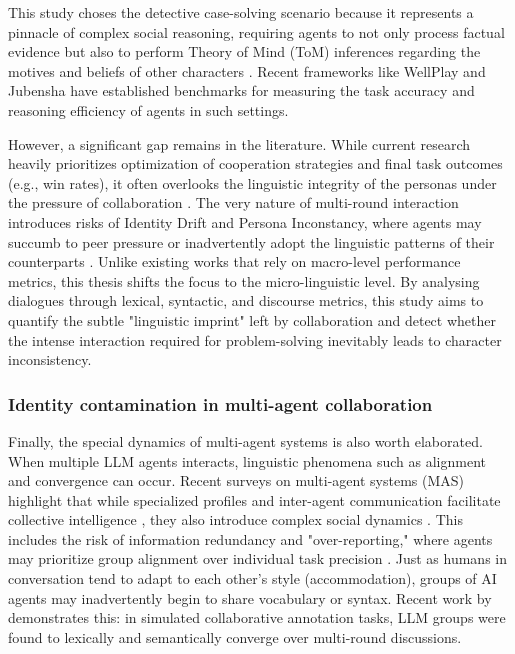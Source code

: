 \documentclass{article}
\begin{document}
This study choses the detective case-solving scenario because it represents a pinnacle of complex social reasoning, requiring agents to not only process factual evidence but also to perform Theory of Mind (ToM) inferences regarding the motives and beliefs of other characters \citep{zhu2024player}. Recent frameworks like WellPlay \citep{zhu2024player} and Jubensha \citep{wu2024jubensha} have established benchmarks for measuring the task accuracy and reasoning efficiency of agents in such settings.

However, a significant gap remains in the literature. While current research heavily prioritizes optimization of cooperation strategies and final task outcomes (e.g., win rates), it often overlooks the linguistic integrity of the personas under the pressure of collaboration \citep{chen2024review, wu2024jubensha, zhu2024player}. The very nature of multi-round interaction introduces risks of Identity Drift and Persona Inconstancy, where agents may succumb to peer pressure or inadvertently adopt the linguistic patterns of their counterparts \citep{choi2024examining, baltaji2024cultured}. Unlike existing works that rely on macro-level performance metrics, this thesis shifts the focus to the micro-linguistic level. By analysing dialogues through lexical, syntactic, and discourse metrics, this study aims to quantify the subtle "linguistic imprint" left by collaboration and detect whether the intense interaction required for problem-solving inevitably leads to character inconsistency.

\subsubsection{Identity contamination in multi-agent collaboration}

Finally, the special dynamics of multi-agent systems is also worth elaborated. When multiple LLM agents interacts, linguistic phenomena such as alignment and convergence can occur. Recent surveys on multi-agent systems (MAS) highlight that while specialized profiles and inter-agent communication facilitate collective intelligence \citep{guo2024review}, they also introduce complex social dynamics \citep{zhu2024player}. This includes the risk of information redundancy and "over-reporting," where agents may prioritize group alignment over individual task precision \citep{guo2026collab}. Just as humans in conversation tend to adapt to each other’s style (accommodation), groups of AI agents may inadvertently begin to share vocabulary or syntax. Recent work by \cite{parfenova2025emergent} demonstrates this: in simulated collaborative annotation tasks, LLM groups were found to lexically and semantically converge over multi-round discussions.
\end{document}
